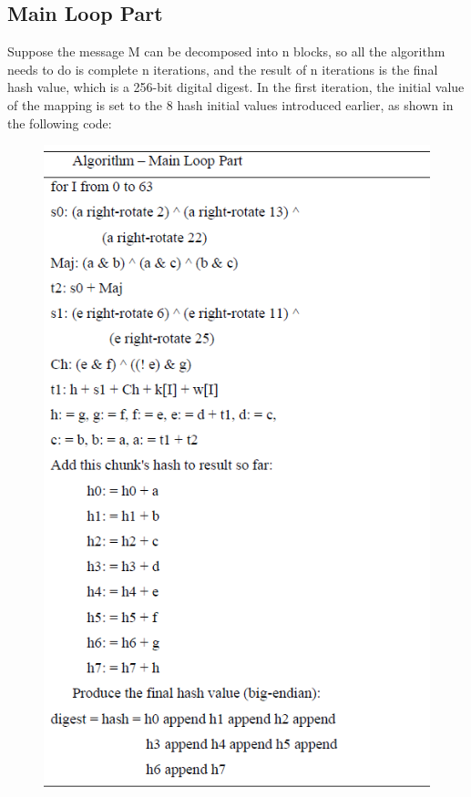 \documentclass[conference]{IEEEtran}
\begin{document}
\subsection{Main Loop Part}
Suppose the message M can be decomposed into n blocks, so all the algorithm needs to do is complete n iterations, and the result of n iterations is the final hash value, which is a 256-bit digital digest. In the first iteration, the initial value of the mapping is set to the 8 hash initial values introduced earlier, as shown in the following code:
\begin{figure}[ht]	
	\centering
	\includegraphics[scale=0.4]{ALG_MLP.png}
\end{figure}
\end{document}
